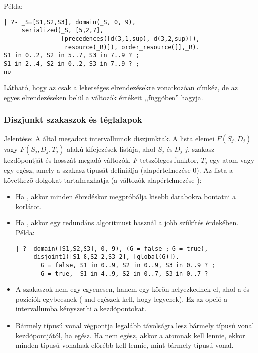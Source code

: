 Példa:

\begin{verbatim}
| ?- _S=[S1,S2,S3], domain(_S, 0, 9),
     serialized(_S, [5,2,7],
                [precedences([d(3,1,sup), d(3,2,sup)]),
                 resource(_R)]), order_resource([],_R).
S1 in 0..2, S2 in 5..7, S3 in 7..9 ? ;
S1 in 2..4, S2 in 0..2, S3 in 7..9 ? ;
no
\end{verbatim}

Látható, hogy az  csak a lehetséges elrendezésekre vonatkozóan
címkéz, de az egyes elrendezéseken belül a változók értékeit ,,függõben'' hagyja.

\subsubsection{Diszjunkt szakaszok és téglalapok}

{}

Jelentése: A  által megadott intervallumok diszjunktak. A  lista
elemei $F(S_j,D_j)$ vagy $F(S_j,D_j,T_j)$ alakú kifejezések listája, ahol $S_j$ és
$D_j$ $j$. szakasz kezdõpontját és hosszát megadó változók. $F$ tetszõleges funktor,
$T_j$ egy atom vagy egy egész, amely a szakasz típusát definiálja (alapértelmezése 0).
Az  lista a következõ dolgokat tartalmazhatja (a  változók
alapértelmezése ):

\begin{itemize}
\item {}
          Ha  , akkor minden ébredéskor megpróbálja kisebb
          darabokra bontatni a korlátot.

\item {}
          Ha  , akkor egy redundáns algoritmust használ a
          jobb szûkítés érdekében. Példa:

\begin{verbatim}
| ?- domain([S1,S2,S3], 0, 9), (G = false ; G = true),
     disjoint1([S1-8,S2-2,S3-2], [global(G)]).
       G = false, S1 in 0..9, S2 in 0..9, S3 in 0..9 ? ;
       G = true,  S1 in 4..9, S2 in 0..7, S3 in 0..7 ? 
\end{verbatim}

\item {}
          A szakaszok nem egy egyenesen, hanem egy körön helyezkednek el,
          ahol a  és  pozíciók egybeesnek ( and
           egészek kell, hogy legyenek). Ez az opció a 
          intervallumba kényszeríti a kezdõpontokat.

\item {}
          Bármely  típusú vonal végpontja legalább  távolságra lesz
          bármely  típusú vonal kezdõpontjától, ha  egész.
          Ha  nem egész, akkor a  atomnak kell lennie, ekkor
          minden  típusú vonalnak elõrébb kell lennie, mint bármely
           típusú vonal.
\end{itemize}


